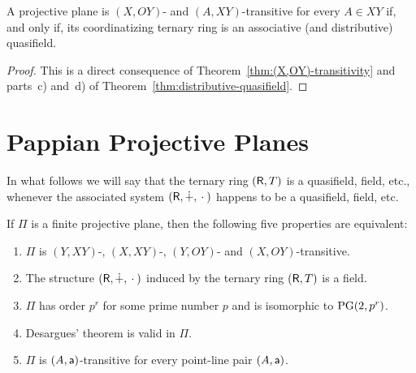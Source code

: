 \begin{thm}
    A projective plane is\/ $(X,OY)$- and\/ $(A,XY)$-transitive for every\/ $A\in XY$ if, and only if, its coordinatizing ternary ring is an associative (and distributive) quasifield.
\end{thm}

\begin{proof}
    This is a direct consequence of Theorem~\ref{thm:(X,OY)-transitivity} and parts~c) and~d) of Theorem~\ref{thm:distributive-quasifield}.
\end{proof}

\section{Pappian Projective Planes}

In what follows we will say that the ternary ring $(\mathsf R,T)$ is a quasifield, field, etc., whenever the associated system $(\mathsf R,\dotplus,{}\cdot{})$ happens to be a quasifield, field, etc.

\begin{thm}\label{thm:finite-desargues-iff-field}
    If\/ $\Pi$ is a finite projective plane, then the following five properties are equivalent:
    \begin{enumerate}[label=\alph*), font=\upshape]
        \item $\Pi$ is\/ $(Y, XY)$-, $(X, XY)$-, $(Y, OY)$- and\/ $(X, OY)$-transitive.
        
        \item The structure\/ $(\mathsf R,\dotplus,{}\cdot{})$ induced by the ternary ring\/ $(\mathsf R,T)$ is a field.
        
        \item $\Pi$ has order $p^r$ for some prime number $p$ and is isomorphic to $\operatorname{PG}(2,p^r)$.

        \item Desargues’ theorem is valid in\/ $\Pi$.
        
        \item $\Pi$ is\/ $(A,\mathsf a)$-transitive for every point-line pair\/ $(A,\mathsf a)$.
    \end{enumerate}
\end{thm}

